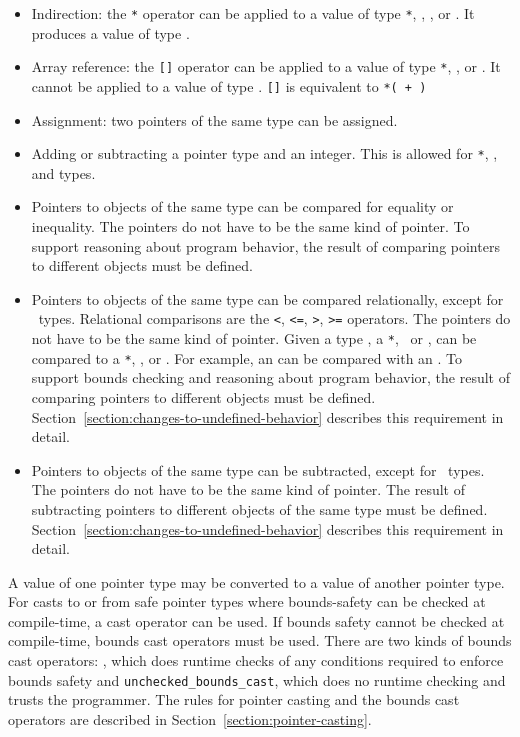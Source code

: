 \begin{itemize}
\item
  Indirection: the \texttt{*} operator can be applied to a value of type
   \texttt{*},
  \ptrT,
  \arrayptrT, or
  \arrayviewT. It
  produces a value of type .
\item
  Array reference: the \texttt{[]} operator can be applied to a
  value of type  \texttt{*}, \arrayptrT, or \arrayviewT. It
  cannot be applied to a value of type \ptrT.
  \texttt{[]} is equivalent to
  \texttt{*( + )}
\item
  Assignment: two pointers of the same type can be assigned.
\item
  Adding or subtracting a pointer type and an integer. This is allowed
  for  \texttt{*}, \arrayptrT, and \arrayviewT types.
\item
  Pointers to objects of the same type can be compared for equality or
  inequality. The pointers do not have to be the same kind of pointer.
  To support reasoning about program behavior, the result of comparing
  pointers to different objects must be defined.
\item
  Pointers to objects of the same type can be compared relationally,
  except for \ptr\ types. Relational comparisons are the
  \verb|<|, \verb|<=|, \verb|>|, \verb|>=| operators. The pointers do not have to be
  the same kind of pointer. Given a type , a 
  \texttt{*}, \arrayptrT\ or   \arrayviewT, can be compared to a  \texttt{*},
  \arrayptrT , or \arrayviewT. For example, an \arrayviewT can be compared with an
  \arrayptrT . To support bounds checking and reasoning about program behavior, the
  result of comparing pointers to different objects must be defined.
  Section~\ref{section:changes-to-undefined-behavior} describes this requirement in detail.
\item
  Pointers to objects of the same type can be subtracted, except for
  \ptr\ types. The pointers do not have to be the same kind of
  pointer. The result of subtracting pointers to different objects of
  the same type must be defined. Section~\ref{section:changes-to-undefined-behavior}
  describes this requirement in detail.
\end{itemize}

A value of one pointer type may be converted to a value of another
pointer type. For casts to or from safe pointer types where
bounds-safety can be checked at compile-time, a cast operator can be
used. If bounds safety cannot be checked at compile-time, bounds cast
operators must be used. There are two kinds of bounds cast operators:
, which does runtime checks of any
conditions required to enforce bounds safety and
\texttt{unchecked\_bounds\_cast}, which does no runtime checking and
trusts the programmer. The rules for pointer casting and the bounds cast
operators are described in Section~\ref{section:pointer-casting}.

